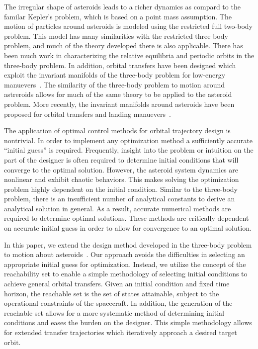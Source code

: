 \documentclass[]{aiaa-tc}%
\begin{document}
The irregular shape of asteroids leads to a richer dynamics as compard to the familar Kepler's problem, which is based on a point mass assumption.
The motion of particles around asteroids is modeled using the restricted full two-body problem. 
This model has many similarities with the restricted three body problem, and much of the theory developed there is also applicable.
There has been much work in characterizing the relative equilibria and periodic orbits in the three-body problem.
In addition, orbital transfers have been designed which exploit the invariant manifolds of the three-body problem for low-energy manuevers~\cite{mingotti2011,grebow2011}.
The similarity of the three-body problem to motion around astreroids allows for much of the same theory to be applied to the asteroid problem.
More recently, the invariant manifolds around asteroids have been proposed for orbital transfers and landing manuevers~\cite{mondelo2010,herrera2014}.


The application of optimal control methods for orbital trajectory design is nontrivial.
In order to implement any optimization method a sufficiently accurate ``initial guess'' is required.
Frequently, insight into the problem or intuition on the part of the designer is often required to determine initial conditions that will converge to the optimal solution.
However, the asteroid system dynamics are nonlinear and exhibit chaotic behaviors. 
This makes solving the optimization problem highly dependent on the initial condition.
Similar to the three-body problem, there is an insufficient number of analytical constants to derive an analytical solution in general. 
As a result, accurate numerical methods are required to determine optimal solutions.
These methods are critically dependent on accurate initial guess in order to allow for convergence to an optimal solution.

In this paper, we extend the design method developed in the three-body problem to motion about asteroids~\cite{kulumani2015}.
Our approach avoids the difficulties in selecting an appropriate initial guess for optimization.
Instead, we utilize the concept of the reachability set to enable a simple methodology of selecting initial conditions to achieve general orbital transfers. 
Given an initial condition and fixed time horizon, the reachable set is the set of states attainable, subject to the operational constraints of the spacecraft. 
In addition, the generation of the reachable set allows for a more systematic method of determining initial conditions and eases the burden on the designer.
This simple methodology allows for extended transfer trajectories which iteratively approach a desired target orbit.
\end{document}
